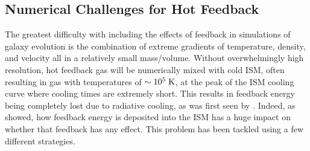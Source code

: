 \subsection{Numerical Challenges for Hot Feedback}
The greatest difficulty with including the effects of feedback in simulations of
galaxy evolution is the combination of extreme gradients of temperature,
density, and velocity all in a relatively small mass/volume.  Without
overwhelmingly high resolution, hot feedback gas will be numerically mixed with
cold ISM, often resulting in gas with temperatures of $\sim10^5\;\rm{K}$, at the
peak of the ISM cooling curve where cooling times are extremely short.  This
results in feedback energy being completely lost due to radiative cooling, as
was first seen by \citet{Katz1992}.  Indeed, as \citet{Thacker2000} showed, how
feedback energy is deposited into the ISM has a huge impact on whether that
feedback has any effect.  This problem has been tackled using a few different
strategies.  

